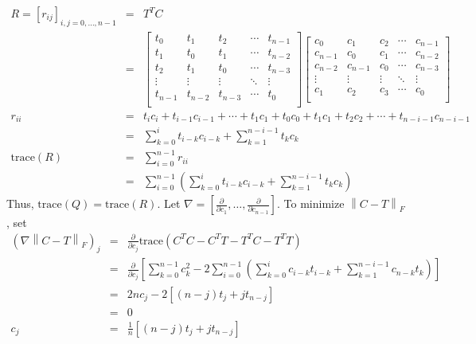 \documentclass[11pt]{article}
\newcommand{\norm}[1]{\left\lVert#1\right\rVert}
\theoremstyle{definition}
\theoremstyle{remark}
\theoremstyle{plain}
\begin{document}
\begin{eqnarray*}
  R=\left[r_{ij}\right]_{i,j=0,\dots,n-1}&=&T^TC\\
                                         &=&\left[
                                             \begin{array}{ccccc}
                                               t_0&t_1&t_2&\cdots&t_{n-1}\\
                                               t_1&t_0&t_1&\cdots&t_{n-2}\\
                                               t_2&t_1&t_0&\cdots&t_{n-3}\\
                                               \vdots&\vdots&\vdots&\ddots&\vdots\\
                                               t_{n-1}&t_{n-2}&t_{n-3}&\cdots&t_0\\
                                             \end{array}
  \right]\left[
  \begin{array}{ccccc}
    c_0&c_1&c_2&\cdots&c_{n-1}\\
    c_{n-1}&c_0&c_1&\cdots&c_{n-2}\\
    c_{n-2}&c_{n-1}&c_0&\cdots&c_{n-3}\\
    \vdots&\vdots&\vdots&\ddots&\vdots\\
    c_1&c_2&c_3&\cdots&c_0\\
  \end{array}
  \right]\\
  r_{ii}&=&t_ic_i+t_{i-1}c_{i-1}+\cdots+t_1c_1+t_0c_0+t_1c_1+t_2c_2+\cdots+t_{n-i-1}c_{n-i-1}\\
                                         &=&\sum_{k=0}^it_{i-k}c_{i-k}+\sum_{k=1}^{n-i-1}t_{k}c_k\\
  \textrm{trace}\left(R\right)&=&\sum_{i=0}^{n-1}r_{ii}\\
                                         &=&\sum_{i=0}^{n-1}\left(\sum_{k=0}^it_{i-k}c_{i-k}+\sum_{k=1}^{n-i-1}t_kc_k\right)
\end{eqnarray*}
Thus, $\textrm{trace}\left(Q\right)=\textrm{trace}\left(R\right)$. Let $\nabla=\left[\frac{\partial}{\partial c_1},\dots,\frac{\partial}{\partial c_{n-1}}\right]$. To minimize $\norm{C-T}_F$, set
\begin{eqnarray*}
  \left(\nabla\norm{C-T}_F\right)_{j}&=&\frac{\partial}{\partial c_j}\textrm{trace}\left(C^TC-C^TT-T^TC-T^TT\right)\\
                                     &=&\frac{\partial}{\partial c_j}\left[\sum_{k=0}^{n-1}c_k^2-2\sum_{i=0}^{n-1}\left(\sum_{k=0}^ic_{i-k}t_{i-k}+\sum_{k=1}^{n-i-1}c_{n-k}t_k\right)\right]\\
                                     &=&2nc_j-2\left[\left(n-j\right)t_j+jt_{n-j}\right]\\
                                     &=&0\\
  c_j&=&\frac{1}{n}\left[\left(n-j\right)t_j+jt_{n-j}\right]
\end{eqnarray*}
\end{document}
